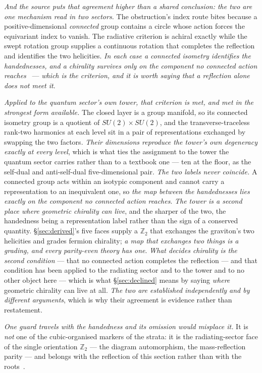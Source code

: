 \documentclass[11pt,a4paper]{article}
\theoremstyle{plain}
\theoremstyle{definition}
\begin{document}
\emph{And the source puts that agreement higher than a shared conclusion: the two are one mechanism read in
two sectors.} The obstruction's index route bites because a positive-dimensional \emph{connected} group contains a
circle whose action forces the equivariant index to vanish. The radiative criterion is achiral exactly while
the swept rotation group supplies a continuous rotation that completes the reflection and identifies the two
helicities. \emph{In each case a connected isometry identifies the handednesses, and a chirality survives
only on the component no connected action reaches}~\cite{JanzenDynamics} --- \emph{which is the criterion,
and it is worth saying that a reflection alone does not meet it}.

\emph{Applied to the quantum sector's own tower, that criterion is met, and met in the strongest form
available.} The closed layer is a group manifold, so its connected isometry group is a quotient of
$SU(2)\times SU(2)$, and the transverse-traceless rank-two harmonics at each level sit in a pair of
representations exchanged by swapping the two factors. \emph{Their dimensions reproduce the tower's own
degeneracy exactly at every level}, which is what ties the assignment to the tower the quantum sector carries
rather than to a textbook one --- ten at the floor, as the self-dual and anti-self-dual five-dimensional
pair. \emph{The two labels never coincide.} A connected group acts within an isotypic component and cannot
carry a representation to an inequivalent one, so \emph{the map between the handednesses lies exactly on the
component no connected action reaches}. \emph{The tower is a second place where geometric chirality can
live}, and the sharper of the two, the handedness being a representation label rather than the sign of a
conserved quantity. \S\ref{sec:derived}'s five faces supply a
$\mathbb{Z}_2$ that exchanges the graviton's two helicities and grades fermion chirality; \emph{a map that
exchanges two things is a grading, and every parity-even theory has one}. \emph{What decides chirality is the
second condition} --- that no connected action completes the reflection --- and that condition has been
applied to the radiating sector and to the tower and to no other object here --- which is what
\S\ref{sec:declined} means by saying \emph{where} geometric chirality can live at all. \emph{The two are
established independently and by different arguments}, which is why their agreement is evidence rather than
restatement.

\emph{One guard travels with the handedness and its omission would misplace it.} It is \emph{not} one of the
cubic-organised markers of the strata: it is the radiating-sector face of the single orientation
$\mathbb{Z}_{2}$ --- the diagram automorphism, the mass-reflection parity --- and belongs with the reflection
of this section rather than with the roots~\cite{JanzenDynamics}.
\end{document}
